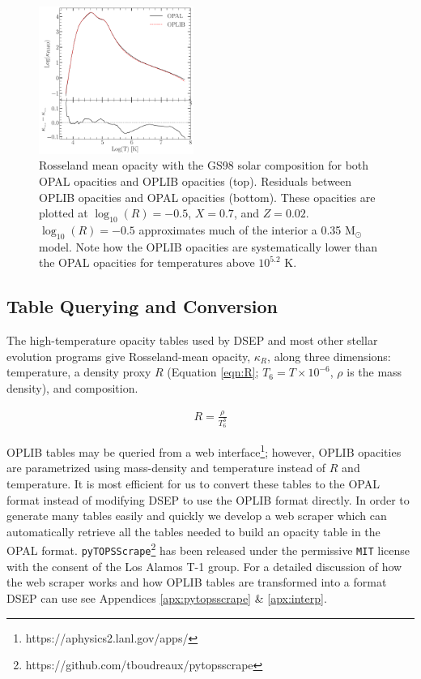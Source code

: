 \begin{figure}
	\centering
	\includegraphics[width=0.45\textwidth]{OpacityComparision.pdf}
	\caption{Rosseland mean opacity with the GS98 solar composition for both
	OPAL opacities and OPLIB opacities (top). Residuals between OPLIB opacities
	and OPAL opacities (bottom). These opacities are plotted at $\log _{10}(R)
	= -0.5$, $X=0.7$, and $Z=0.02$. $\log _{10}(R)=-0.5$ approximates
	much of the interior a 0.35 M$_{\odot}$ model. Note how the OPLIB
	opacities are systematically lower than the OPAL opacities for temperatures
	above $10^{5.2}$ K.}
	\label{fig:opacComp}
\end{figure}

\subsection{Table Querying and Conversion}
The high-temperature opacity tables used by DSEP and most other stellar
evolution programs give Rosseland-mean opacity, $\kappa_{R}$, along three
dimensions: temperature, a density proxy $R$ (Equation \ref{eqn:R}; $T_{6} =
T\times10^{-6}$, $\rho$ is the mass density), and composition. 

\begin{align} \label{eqn:R}
	R = \frac{\rho}{T_{6}^{3}}
\end{align}

OPLIB tables may be queried from a web
interface\footnote{https://aphysics2.lanl.gov/apps/}; however, OPLIB opacities
are parametrized using mass-density and temperature instead of $R$ and
temperature. It is most efficient for us to convert these tables to the OPAL
format instead of modifying DSEP to use the OPLIB format directly. In order to
generate many tables easily and quickly we develop a web scraper
\citep[\texttt{pyTOPSScrape},][]{Boudreaux22} which can automatically retrieve
all the tables needed to build an opacity table in the OPAL format.
\texttt{pyTOPSScrape}\footnote{https://github.com/tboudreaux/pytopsscrape} has
been released under the permissive \texttt{MIT} license with the consent of the
Los Alamos T-1 group. For a detailed discussion of how the web scraper works
and how OPLIB tables are transformed into a format DSEP can use see Appendices
\ref{apx:pytopsscrape} \& \ref{apx:interp}.

